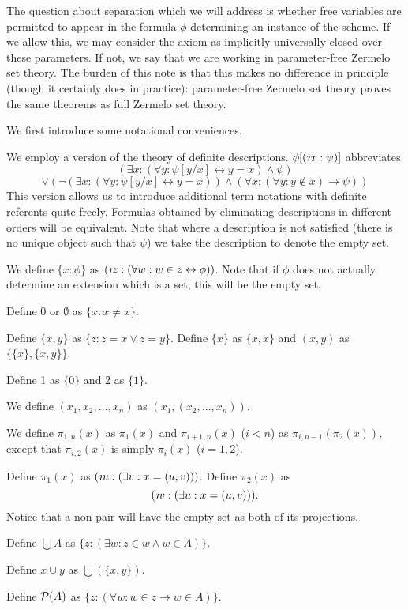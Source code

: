 \documentclass[12pt]{article}
\newcommand{\riota}{\rotatebox[origin=c]{180}{$\iota$}}
\begin{document}
The question about separation which we will address is whether free variables are permitted to appear in the formula $\phi$ determining an instance of the scheme.  If we allow this, we may consider the axiom as implicitly universally closed over these parameters.  If not, we say that we are working in parameter-free Zermelo set theory.  The burden of this note is that this makes no difference in principle (though it certainly does in practice):  parameter-free Zermelo set theory proves the same theorems as full Zermelo set theory.

We first introduce some notational conveniences.

We employ a version of the theory of definite descriptions.  $\phi[(\riota x:\psi)]$ abbreviates $$(\exists x:(\forall y:\psi[y/x]\leftrightarrow y=x) \wedge \psi)
$$  $$\vee (\neg(\exists x:(\forall y:\psi[y/x]\leftrightarrow y=x))\wedge (\forall x:(\forall y:y \not\in x) \rightarrow \psi))$$  This version allows us to introduce additional term notations with definite referents quite freely.  Formulas obtained by eliminating descriptions in different orders will be equivalent.  Note that where a description is not satisfied (there is no unique object such that $\psi$) we take the description to denote the empty set.

We define $\{x : \phi\}$ as $(\riota z:(\forall w:w \in z \leftrightarrow \phi))$.  Note that if $\phi$ does not actually determine an extension which is a set, this will be the empty set.

Define 0 or $\emptyset$ as $\{x:x \neq x\}$.

Define $\{x,y\}$ as $\{z:z=x \vee z=y\}$.  Define $\{x\}$ as $\{x,x\}$ and $(x,y)$ as $\{\{x\},\{x,y\}\}$.

Define 1 as $\{0\}$ and 2 as $\{1\}$.

We define $(x_1,x_2,\ldots,x_n)$ as $(x_1,(x_2,\ldots,x_n))$.

We define $\pi_{1,n}(x)$ as $\pi_1(x)$ and $\pi_{i+1,n}(x)$ ($i< n$) as $\pi_{i,n-1}(\pi_2(x))$, except that $\pi_{i,2}(x)$ is simply $\pi_i(x)$ ($i=1,2$).

Define $\pi_1(x)$ as $(\riota u:(\exists v:x=(u,v)))$.  Define $\pi_2(x)$ as $$(\riota v:(\exists u:x=(u,v))).$$  Notice that a non-pair will have the empty set as both of its projections.

Define $\bigcup A$ as $\{z:(\exists w:z \in w \wedge w \in A)\}$.

Define $x \cup y$ as $\bigcup(\{x,y\})$.

Define ${\cal P}(A)$ as $\{z:(\forall w:w \in z \rightarrow w \in A)\}$.
\end{document}
